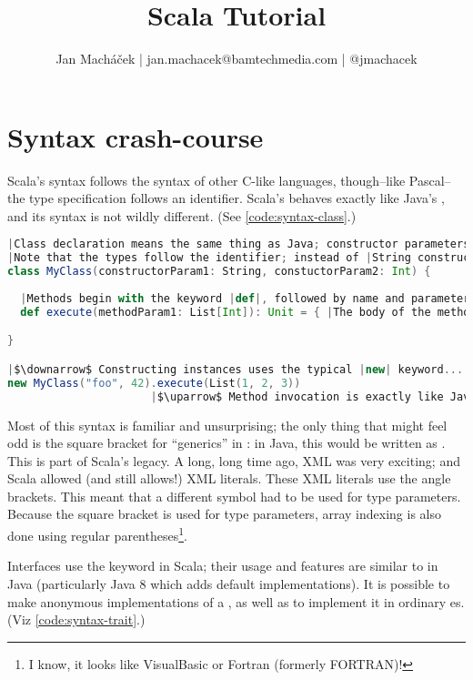 \documentclass[10 pt]{article}
\title{Scala Tutorial}
\author{Jan Macháček | jan.machacek@bamtechmedia.com | @jmachacek}
\begin{document}
\maketitle

\newpage

\section{Syntax crash-course}
Scala's syntax follows the syntax of other C-like languages, though--like Pascal--the type specification follows an identifier. Scala's  behaves exactly like Java's , and its syntax is not wildly different. (See \autoref{code:syntax-class}.)

\begin{lstlisting}[caption={Classes and methods}, label={code:syntax-class}, language=Scala, escapechar=|]
|Class declaration means the same thing as Java; constructor parameters are specified in the block immediately following the class name.|
|Note that the types follow the identifier; instead of |String constructorParam1| Scala uses |constructorParam1: String
class MyClass(constructorParam1: String, constuctorParam2: Int) {
  
  |Methods begin with the keyword |def|, followed by name and parameters. The return type follows similar pattern; |Unit| means |void.
  def execute(methodParam1: List[Int]): Unit = { |The body of the method follows the equals sign.| }

}

|$\downarrow$ Constructing instances uses the typical |new| keyword...|
new MyClass("foo", 42).execute(List(1, 2, 3))
                      |$\uparrow$ Method invocation is exactly like Java's|  
\end{lstlisting}

Most of this syntax is familiar and unsurprising; the only thing that might feel odd is the square bracket for ``generics'' in : in Java, this would be written as . This is part of Scala's legacy. A long, long time ago, XML was very exciting; and Scala allowed (and still allows!) XML literals. These XML literals use the angle brackets. This meant that a different symbol had to be used for type parameters. Because the square bracket is used for type parameters, array indexing is also done using regular parentheses\footnote{I know, it looks like VisualBasic or Fortran (formerly FORTRAN)!}.

Interfaces use the  keyword in Scala; their usage and features are similar to  in Java (particularly Java 8 which adds default implementations). It is possible to make anonymous implementations of a , as well as to implement it in ordinary es. (Viz \autoref{code:syntax-trait}.)
\end{document}
